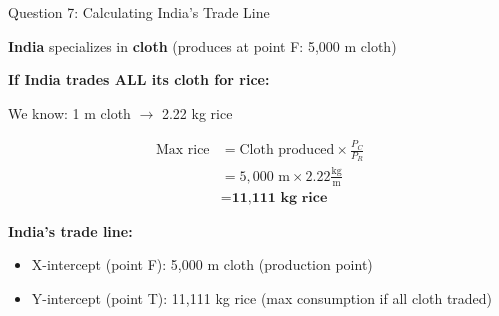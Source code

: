 \documentclass{beamer}
\begin{document}
\begin{frame}{Question 7: Calculating India's Trade Line}

\textbf{India} specializes in \textbf{cloth} (produces at point F: 5,000 m cloth)

\vspace{0.3cm}

\textbf{If India trades ALL its cloth for rice:}

\vspace{0.2cm}

We know: 1 m cloth $\rightarrow$ 2.22 kg rice

\vspace{0.2cm}

\begin{align*}
\text{Max rice} &= \text{Cloth produced} \times \frac{P_C}{P_R} \\[0.3cm]
&= 5,000 \text{ m} \times 2.22 \frac{\text{kg}}{\text{m}} \\[0.3cm]
&= \textbf{11,111 kg rice}
\end{align*}

\vspace{0.3cm}

\textbf{India's trade line:}
\begin{itemize}
    \item X-intercept (point F): 5,000 m cloth (production point)
    \item Y-intercept (point T): 11,111 kg rice (max consumption if all cloth traded)
\end{itemize}

\end{frame}

\end{document}
